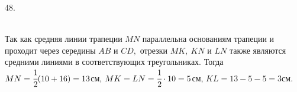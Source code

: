 48. \begin{figure}[ht!]
\end{figure}\\
Так как средняя линии трапеции $MN$ параллельна основаниям трапеции и проходит через середины $AB$ и $CD,$ отрезки $MK,\ KN$ и $LN$ также являются средними линиями в соответствующих треугольниках. Тогда $MN=\cfrac{1}{2}(10+16)=13$см, $MK=LN=\cfrac{1}{2}\cdot10=5$см, $KL=13-5-5=3$см.\\
